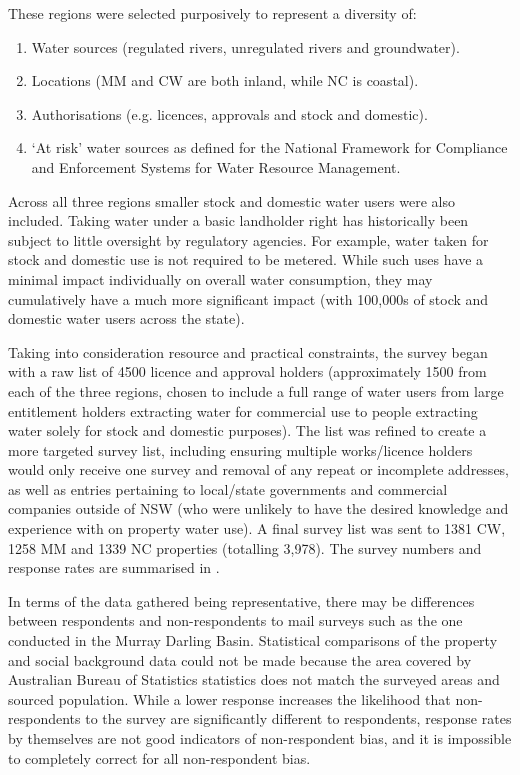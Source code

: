 \documentclass[12pt, a4paper]{article}
\begin{document}
These regions were selected purposively to represent a diversity of:

\begin{enumerate}
	\item Water sources (regulated rivers, unregulated rivers and groundwater).
	\item Locations (MM and CW are both inland, while NC is coastal).
	\item Authorisations (e.g. licences, approvals and stock and domestic).
	\item ‘At risk’ water sources as defined for the National Framework for Compliance and Enforcement Systems for Water Resource Management.  
\end{enumerate}
 
Across all three regions smaller stock and domestic water users were also included. Taking water under a basic landholder right has historically been subject to little oversight by regulatory agencies. For example, water taken for stock and domestic use is not required to be metered. While such uses have a minimal impact individually on overall water consumption, they may cumulatively have a much more significant impact (with 100,000s of stock and domestic water users across the state).

Taking into consideration resource and practical constraints, the survey began with a raw list of 4500 licence and approval holders (approximately 1500 from each of the three regions, chosen to include a full range of water users from large entitlement holders extracting water for commercial use to people extracting water solely for stock and domestic purposes). The list was refined to create a more targeted survey list, including ensuring multiple works/licence holders would only receive one survey and removal of any repeat or incomplete addresses, as well as entries pertaining to local/state governments and commercial companies outside of NSW (who were unlikely to have the desired knowledge and experience with on property water use). A final survey list was sent to 1381 CW, 1258 MM and 1339 NC properties (totalling 3,978). The survey numbers and response rates are summarised in \autocite{Holley:2015te}.

In terms of the data gathered being representative, there may be differences between respondents and non-respondents to mail surveys such as the one conducted in the Murray Darling Basin.  Statistical comparisons of the property and social background data could not be made because the area covered by Australian Bureau of Statistics statistics does not match the surveyed areas and sourced population.  While a lower response increases the likelihood that non-respondents to the survey are significantly different to respondents, response rates by themselves are not good indicators of non-respondent bias, and it is impossible to completely correct for all non-respondent bias.
\end{document}
